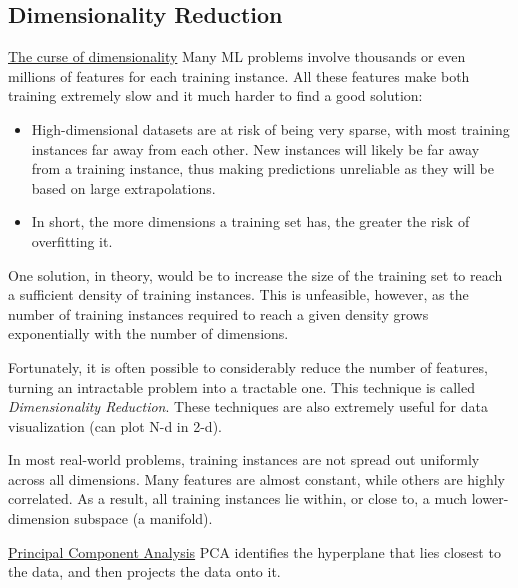 \newpage
\subsection{Dimensionality Reduction}

\underline{The curse of dimensionality}\newline
Many ML problems involve thousands or even millions of features for each training instance.
All these features make both training extremely slow
and it much harder to find a good solution:

\vspace{-3.0mm}
\begin{itemize}
\item
High-dimensional datasets are at risk of being very sparse,
with most training instances far away from each other.
New instances will likely be far away from a training instance,
thus making predictions unreliable as they will be based on large extrapolations.
\item
In short, the more dimensions a training set has,
the greater the risk of overfitting it.
\end{itemize}

\vspace{-3.0mm}
One solution, in theory,
would be to increase the size of the training set to reach a sufficient density of training instances.
This is unfeasible, however,
as the number of training instances required to reach a given density grows exponentially with the number of dimensions.

Fortunately,
it is often possible to considerably reduce the number of features,
turning an \newline intractable problem into a tractable one.
This technique is called \textit{Dimensionality Reduction}.\newline
These techniques are also extremely useful for data visualization (can plot N-d in 2-d).

In most real-world problems,
training instances are not spread out uniformly across all dimensions.
Many features are almost constant, while others are highly correlated.
As a result,
all training instances lie within, or close to,
a much lower-dimension subspace (a manifold).

\underline{Principal Component Analysis}\newline
PCA identifies the hyperplane that lies closest to the data,
and then projects the data onto it.

